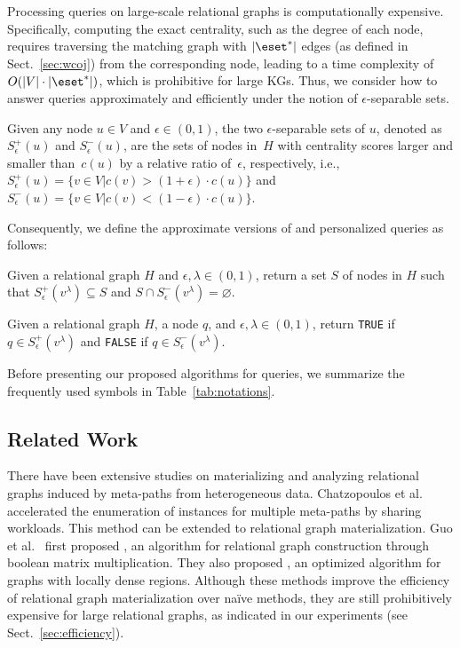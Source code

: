 Processing \ced queries on large-scale relational graphs is computationally expensive. Specifically, computing the exact centrality, such as the degree of each node, requires traversing the matching graph with $|\eset^*|$ edges (as defined in Sect.~\ref{sec:wcoj}) from the corresponding node, leading to a time complexity of $O(|V|\cdot|\eset^*|)$, which is prohibitive for large KGs. Thus, we consider how to answer \ced queries approximately and efficiently under the notion of $\epsilon$-separable sets.
\begin{definition}
  Given any node $u\in V$ and $\epsilon\in(0,1)$, the two $\epsilon$-separable sets of $u$, denoted as $S^+_\epsilon(u)$ and $S^-_\epsilon(u)$, are the sets of nodes in~$H$ with centrality scores larger and smaller than~$c(u)$ by a relative ratio of~$\epsilon$, respectively, i.e., $S^+_\epsilon(u) = \{v \in V | c(v) > (1+\epsilon) \cdot c(u)\}$ and $S^-_\epsilon(u)=\{v \in V | c(v) < (1-\epsilon) \cdot c(u)\}$.
\end{definition}
Consequently, we define the approximate versions of \ced and personalized \ced queries as follows:
\begin{problem}\label{problem:approxHUB}
  Given a relational graph $H$ and $\epsilon, \lambda \in (0, 1)$, return a set $S$ of nodes in $H$ such that $S^+_\epsilon(v^\lambda) \subseteq S$ and $S \cap S^-_\epsilon(v^\lambda) = \varnothing$.
\end{problem}
\begin{problem}\label{problem:approxPer}
  Given a relational graph $H$, a node $q$, and $\epsilon, \lambda \in (0, 1)$, return \texttt{TRUE} if $q\in S^+_\epsilon(v^\lambda)$ and \texttt{FALSE} if $q\in S^-_\epsilon(v^\lambda)$.
\end{problem}

Before presenting our proposed algorithms for \ced queries, we summarize the frequently used symbols in Table~\ref{tab:notations}.



\subsection{Related Work}
\label{sec:related}

There have been extensive studies on materializing and analyzing relational graphs induced by meta-paths from heterogeneous data.
Chatzopoulos et al.~\cite{chatzopoulos2023atrapos} accelerated the enumeration of instances for multiple meta-paths by sharing workloads.
This method can be extended to relational graph materialization.
Guo et al.~\cite{guo2024efficient} first proposed \boolap, an algorithm for relational graph construction through boolean matrix multiplication.
They also proposed \boolapp, an optimized algorithm for graphs with locally dense regions.
Although these methods improve the efficiency of relational graph materialization over na\"ive methods, they are still prohibitively expensive for large relational graphs, as indicated in our experiments (see Sect.~\ref{sec:efficiency}).

